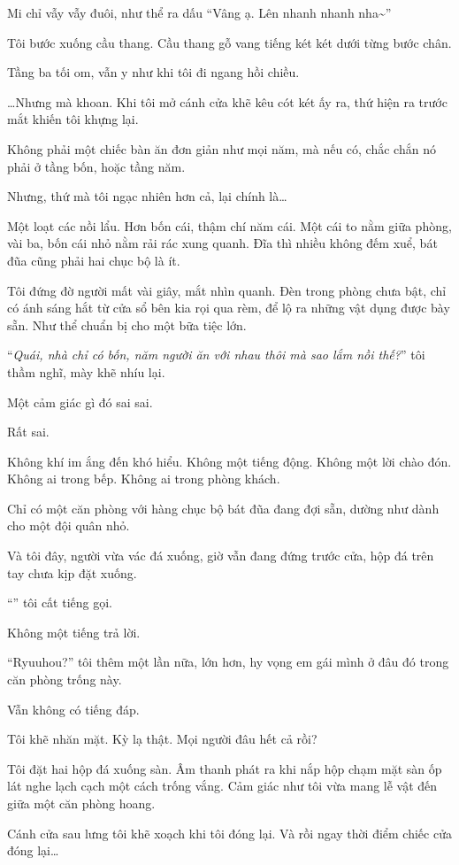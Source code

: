 \documentclass[../main.tex]{subfiles}
\begin{document}
Mi chỉ vẫy vẫy đuôi, như thể ra dấu ``Vâng ạ. Lên nhanh nhanh nha\~{}''

Tôi bước xuống cầu thang. Cầu thang gỗ vang tiếng két két dưới từng bước chân.

Tầng ba tối om, vẫn y như khi tôi đi ngang hồi chiều.

\dots Nhưng mà khoan. Khi tôi mở cánh cửa khẽ kêu cót két ấy ra, thứ hiện ra trước mắt khiến tôi khựng lại.

Không phải một chiếc bàn ăn đơn giản như mọi năm, mà nếu có, chắc chắn nó phải ở tầng bốn, hoặc tầng năm.

Nhưng, thứ mà tôi ngạc nhiên hơn cả, lại chính là\dots

Một loạt các nồi lẩu. Hơn bốn cái, thậm chí năm cái. Một cái to nằm giữa phòng, vài ba, bốn cái nhỏ nằm rải rác xung quanh. Đĩa thì nhiều không đếm xuể, bát đũa cũng phải hai chục bộ là ít.

Tôi đứng đờ người mất vài giây, mắt nhìn quanh. Đèn trong phòng chưa bật, chỉ có ánh sáng hắt từ cửa sổ bên kia rọi qua rèm, để lộ ra những vật dụng được bày sẵn. Như thể chuẩn bị cho một bữa tiệc lớn.

``\textit{Quái, nhà chỉ có bốn, năm người ăn với nhau thôi mà sao lắm nồi thế?}'' tôi thầm nghĩ, mày khẽ nhíu lại.

Một cảm giác gì đó sai sai.

Rất sai.

Không khí im ắng đến khó hiểu. Không một tiếng động. Không một lời chào đón. Không ai trong bếp. Không ai trong phòng khách.

Chỉ có một căn phòng với hàng chục bộ bát đũa đang đợi sẵn, dường như dành cho một đội quân nhỏ.

Và tôi đây, người vừa vác đá xuống, giờ vẫn đang đứng trước cửa, hộp đá trên tay chưa kịp đặt xuống.

``'' tôi cất tiếng gọi.

Không một tiếng trả lời.

``Ryuuhou?'' tôi thêm một lần nữa, lớn hơn, hy vọng em gái mình ở đâu đó trong căn phòng trống này.

Vẫn không có tiếng đáp.

Tôi khẽ nhăn mặt. Kỳ lạ thật. Mọi người đâu hết cả rồi?

Tôi đặt hai hộp đá xuống sàn. Âm thanh phát ra khi nắp hộp chạm mặt sàn ốp lát nghe lạch cạch một cách trống vắng. Cảm giác như tôi vừa mang lễ vật đến giữa một căn phòng hoang.

Cánh cửa sau lưng tôi khẽ xoạch khi tôi đóng lại. Và rồi ngay thời điểm chiếc cửa đóng lại\dots
\end{document}
